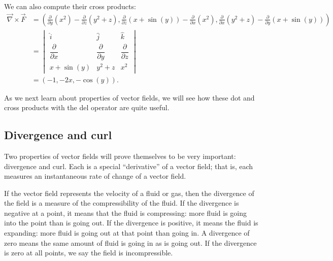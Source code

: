 We can also compute their cross products:
\allowdisplaybreaks
\begin{align*}
{\vec{\nabla}\times \vec F }&= {\left( \frac{\partial}{\partial y}\left(x^2\right)-\frac{\partial}{\partial z}\left(y^2+z\right),\frac{\partial}{\partial z}\left(x+\sin(y)\right)-\frac{\partial}{\partial x}\left(x^2\right),\frac{\partial}{\partial x}\left(y^2+z\right)-\frac{\partial}{\partial y}\left(x+\sin (y)\right)\right) }\\
&=\begin{vmatrix}\hat{i}&\hat{j}&\hat{k}\\[0.2cm]
\dfrac{\partial}{\partial x}&\dfrac{\partial}{\partial y}&\dfrac{\partial}{\partial z}\\[0.2cm]
x+\sin(y)&y^2+z&x^2\end{vmatrix}\\
&=\left( -1,-2x,-\cos(y)\right).
\end{align*}\normalsize

As we next learn about properties of vector fields, we will see how these dot and cross products with the del operator are quite useful.

\subsection{Divergence and curl}
	\checkoddpage
{}
Two properties of vector fields will prove themselves to be very important: divergence and curl. Each is a special ``derivative'' of a vector field; that is, each measures an instantaneous rate of change of a vector field.

If the vector field represents the velocity of a fluid or gas, then the divergence of the field is a measure of the compressibility of the fluid. If the divergence is negative at a point, it means that the fluid is compressing: more fluid is going into the point than is going out. If the divergence is positive, it means the fluid is expanding: more fluid is going out at that point than going in. A divergence of zero means the same amount of fluid is going in as is going out. If the divergence is zero at all points, we say the field is incompressible.

